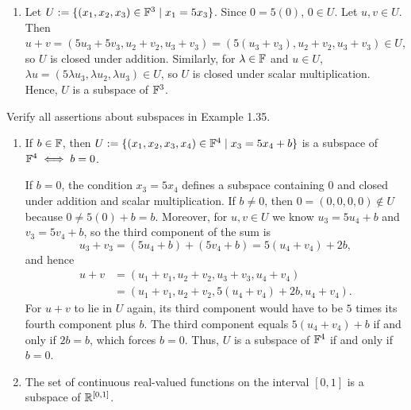 \begin{xrcs}
\begin{xsol}
\begin{enumerate}
    \item Let $U := \{(x_1, x_2, x_3) \in \mathbb{F}^3 \mid x_1 = 5x_3\}$. Since $0 = 5(0)$, $0 \in U$. Let $u,v \in U$. Then $u+v = (5u_3+5v_3, u_2+v_2, u_3+v_3) = (5(u_3+v_3), u_2+v_2, u_3+v_3) \in U$, so $U$ is closed under addition. Similarly, for $\lambda \in \mathbb{F}$ and $u \in U$, $\lambda u = (5\lambda u_3, \lambda u_2, \lambda u_3) \in U$, so $U$ is closed under scalar multiplication. Hence, $U$ is a subspace of $\mathbb{F}^3$.
  \end{enumerate}
  \end{xsol}
\end{xrcs}

\begin{xrcs}
  Verify all assertions about subspaces in Example 1.35.

  \begin{enumerate}
    \item {
      If $b \in \mathbb{F}$, then $U := \{(x_1, x_2, x_3, x_4) \in \mathbb{F}^4 \mid x_3 = 5x_4+b \}$ is a subspace of $\mathbb{F}^4 \iff b=0$.

      \begin{xsol}
        If $b=0$, the condition $x_3 = 5x_4$ defines a subspace containing $0$ and closed under addition and scalar multiplication. If $b \neq 0$, then $0 = (0,0,0,0) \notin U$ because $0 \neq 5(0) + b = b$.
        Moreover, for $u,v \in U$ we know $u_3 = 5u_4 + b$ and $v_3 = 5v_4 + b$, so the third component of the sum is
        \begin{equation}
          u_3 + v_3 = (5u_4 + b) + (5v_4 + b) = 5(u_4+v_4) + 2b,
        \end{equation}
        and hence
        \begin{equation}
          \begin{aligned}
            u+v &= (u_1+v_1, u_2+v_2, u_3+v_3, u_4+v_4) \\
                &= (u_1+v_1, u_2+v_2, 5(u_4 + v_4) + 2b, u_4+v_4).
          \end{aligned}
        \end{equation}
        For $u+v$ to lie in $U$ again, its third component would have to be $5$ times its fourth component plus $b$.
        The third component equals $5(u_4+v_4) + b$ if and only if $2b = b$, which forces $b=0$.
        Thus, $U$ is a subspace of $\mathbb{F}^4$ if and only if $b=0$.
      \end{xsol}
    }

    \item{
      The set of continuous real-valued functions on the interval $[0,1]$ is a subspace of $\mathbb{R}^{[0,1]}$.

}
\end{enumerate}
\end{xrcs}
